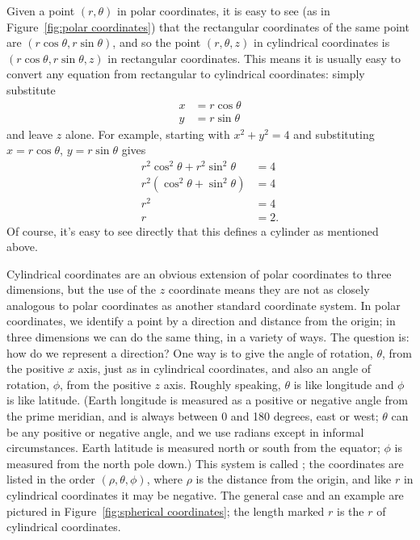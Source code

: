 Given a point $(r,\theta)$ in polar coordinates, it is easy 
to see  (as in Figure~\ref{fig:polar coordinates}) that
the rectangular coordinates of the same point are
$(r\cos\theta,r\sin\theta)$, and so the point $(r,\theta,z)$ in
cylindrical coordinates is $(r\cos\theta,r\sin\theta,z)$ in
rectangular coordinates. This means it is usually easy to convert any
equation from rectangular to cylindrical coordinates: simply substitute
\begin{align*}
  x&=r\cos\theta	\\
  y&=r\sin\theta
\end{align*}
and leave $z$ alone.
For example,
starting with $x^2+y^2=4$ and substituting $x=r\cos\theta$,
$y=r\sin\theta$ gives 
\begin{align*}
  r^2\cos^2\theta+r^2\sin^2\theta&=4	\\
  r^2(\cos^2\theta+\sin^2\theta)&=4	\\
  r^2&=4	\\
  r&=2.
\end{align*}
Of course, it's easy to see directly that this defines a cylinder as
mentioned above.

Cylindrical coordinates are an obvious extension of polar coordinates
to three dimensions, but the use of the $z$ coordinate means they are
not as closely analogous to polar coordinates as another standard
coordinate system. In polar coordinates, we identify a point by a
direction and distance from the origin; in three dimensions we can do
the same thing, in a variety of ways. The question is: how do we
represent a direction? One way is to give the angle of rotation,
$\theta$, from the positive $x$ axis, just as in cylindrical
coordinates, and also an angle of rotation, $\phi$, from the positive
$z$ axis. Roughly speaking, $\theta$ is like longitude and $\phi$ is
like latitude. (Earth longitude is measured as a positive or negative
angle from the prime meridian, and is always between 0 and 180
degrees, east or west; $\theta$ can be any positive or negative angle,
and we use radians except in informal circumstances. 
Earth latitude is measured north or south
from the equator; $\phi$ is measured from the north pole down.) This
system is called ; 
the coordinates are listed in the order
$(\rho,\theta,\phi)$, where $\rho$ is the distance from the
origin, and like $r$ in cylindrical coordinates it may be negative. 
The general case and an
example are pictured in Figure~\ref{fig:spherical coordinates}; the
length marked $r$ is the $r$ of cylindrical coordinates.

